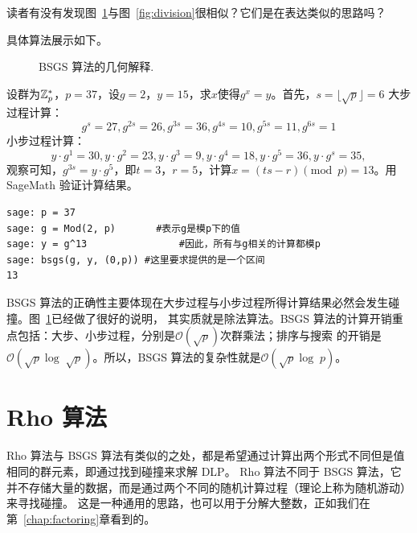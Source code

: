 \begin{thinking}
  读者有没有发现图~\ref{fig:bsgs}与图~\ref{fig:division}很相似？它们是在表达类似的思路吗？
\end{thinking}

具体算法展示如下。
\begin{figure}
\begin{center}

\caption{BSGS 算法的几何解释.}
\label{fig:bsgs}       %
\end{center}
\end{figure}

\begin{center}
	
\end{center}

\begin{example}
设群为${\mathbb Z}_p^*$，$p = 37$，设$g = 2$，$y = 15$，求$x$使得$g^x = y$。首先，$s = \lfloor \sqrt{p} \rfloor = 6$
大步过程计算：
\[g^s = 27, g^{2s}=26 ,  g^{3s}=36 , g^{4s}=10 , g^{5s}=11 , g^{6s}= 1 \]
小步过程计算：
\[y\cdot g^1 =30 , y\cdot g^2 =23,  y\cdot g^3 = 9, y\cdot g^4=18,  y\cdot g^5=36, y\cdot g^s =35, \]
观察可知，$g^{3s} = y\cdot g^5$，即$t = 3$，$r = 5$，计算$x = (ts - r) \pmod{p} = 13$。用 SageMath 验证计算结果。

\begin{lstlisting}
sage: p = 37
sage: g = Mod(2, p)       #表示g是模p下的值
sage: y = g^13                #因此，所有与g相关的计算都模p
sage: bsgs(g, y, (0,p)) #这里要求提供的是一个区间
13
\end{lstlisting}
\end{example}
BSGS 算法的正确性主要体现在大步过程与小步过程所得计算结果必然会发生碰撞。图~\ref{fig:bsgs}已经做了很好的说明，
其实质就是除法算法。BSGS 算法的计算开销重点包括：大步、小步过程，分别是$\mathcal{O}(\sqrt{p})$次群乘法；排序与搜索
的开销是$\mathcal{O}(\sqrt{p} \log\; \sqrt{p})$。所以，BSGS 算法的复杂性就是$\mathcal{O}(\sqrt{p} \log\; p)$。

\section{Rho 算法}
\label{sec:prho}
Rho 算法与 BSGS 算法有类似的之处，都是希望通过计算出两个形式不同但是值相同的群元素，即通过找到碰撞来求解 DLP。
Rho 算法不同于 BSGS 算法，它并不存储大量的数据，而是通过两个不同的随机计算过程（理论上称为随机游动）来寻找碰撞。
这是一种通用的思路，也可以用于分解大整数，正如我们在第~\ref{chap:factoring}章看到的。

